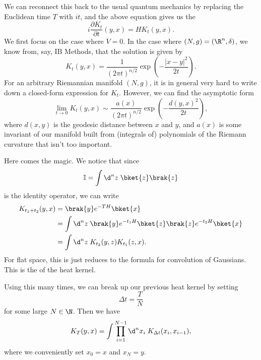 \documentclass[a4paper]{article}
\begin{document}
We can reconnect this back to the usual quantum mechanics by replacing the Euclidean time $T$ with $it$, and the above equation gives us the 
\[
  i \frac{\partial K_t}{\partial t} (y, x) = H K_t(y, x).
\]
We first focus on the case where $V = 0$. In the case where $(N, g) = (\R^n, \delta)$, we know from, say, IB Methods, that the solution is given by
\[
  K_t(y, x) = \frac{1}{(2\pi t)^{n/2}} \exp\left(-\frac{|x - y|^2}{2t}\right).
\]
For an arbitrary Riemannian manifold $(N, g)$, it is in general very hard to write down a closed-form expression for $K_t$. However, we can find the asymptotic form
\[
  \lim_{t \to 0} K_t(y, x) \sim \frac{a(x)}{(2\pi t)^{n/2}} \exp\left(- \frac{d(y, x)^2}{2t}\right),
\]
where $d(x, y)$ is the geodesic distance between $x$ and $y$, and $a(x)$ is some invariant of our manifold built from (integrals of) polynomials of the Riemann curvature that isn't too important.

Here comes the magic. We notice that since
\[
  \mathbb{I} = \int \d^n z\; \bket{z} \brak{z}
\]
is the identity operator, we can write
\begin{align*}
  K_{t_1 + t_2} (y, x) &= \brak{y} e^{-TH} \bket{x}\\
  &= \int \d^n z\; \brak{y} e^{-t_1H} \bket{z}\brak{z} e^{-t_2H} \bket{x} \\
  &= \int \d^n z\; K_{t_2}(y, z) K_{t_1}(z, x).
\end{align*}
For flat space, this is just reduces to the formula for convolution of Gaussians. This is the  of the heat kernel.

Using this many times, we can break up our previous heat kernel by setting
\[
  \Delta t = \frac{T}{N}
\]
for some large $N \in \N$. Then we have
\[
  K_T(y, x) = \int \prod_{i = 1}^{N - 1} \d^n x_i\; K_{\Delta t} (x_i, x_{i - 1}),
\]
where we conveniently set $x_0 = x$ and $x_N = y$.
\end{document}
